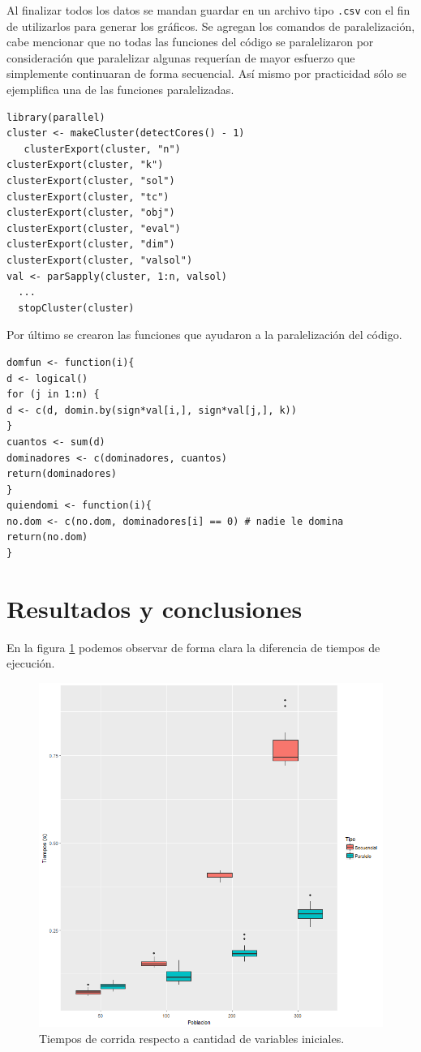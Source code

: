 \documentclass[a4paper]{article}
\begin{document}
Al finalizar todos los datos se mandan guardar en un archivo tipo \texttt{.csv} con el fin de utilizarlos para generar los gráficos. Se agregan los comandos de paralelización, cabe mencionar que no todas las funciones del código se paralelizaron por consideración que paralelizar algunas requerían de mayor esfuerzo que simplemente continuaran de forma secuencial. Así mismo por practicidad sólo se ejemplifica una de las funciones paralelizadas.
\begin{lstlisting}[frame=single]
library(parallel)
cluster <- makeCluster(detectCores() - 1)
   clusterExport(cluster, "n")
clusterExport(cluster, "k")
clusterExport(cluster, "sol")
clusterExport(cluster, "tc")
clusterExport(cluster, "obj")
clusterExport(cluster, "eval")
clusterExport(cluster, "dim")
clusterExport(cluster, "valsol")
val <- parSapply(cluster, 1:n, valsol)
  ...
  stopCluster(cluster)
\end{lstlisting}

Por último se crearon las funciones que ayudaron a la paralelización del código.

\begin{lstlisting}[frame=single]
  domfun <- function(i){
d <- logical()
for (j in 1:n) {
d <- c(d, domin.by(sign*val[i,], sign*val[j,], k))
}
cuantos <- sum(d)
dominadores <- c(dominadores, cuantos)
return(dominadores)
}
quiendomi <- function(i){
no.dom <- c(no.dom, dominadores[i] == 0) # nadie le domina
return(no.dom)
}
\end{lstlisting}


\section{Resultados y conclusiones}
En la figura \ref{fig:ambos} podemos observar de forma clara la diferencia de tiempos de ejecución. 

\begin{figure}[h!]
\centering
\includegraphics[width=0.7\linewidth]{ambos}
\caption{Tiempos de corrida respecto a cantidad de variables iniciales.}
\label{fig:ambos}
\end{figure}
\end{document}
